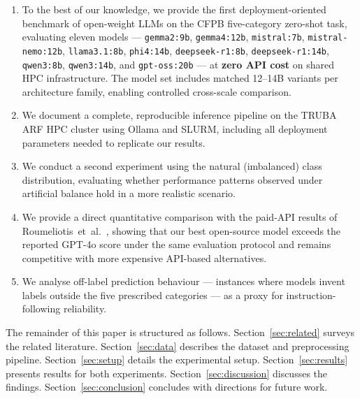 \documentclass[10pt,a4paper,twocolumn]{article}
\begin{document}
\begin{enumerate}
  \item To the best of our knowledge, we provide the first
        deployment-oriented benchmark of open-weight LLMs on the
        CFPB five-category zero-shot task, evaluating eleven models ---
        \texttt{gemma2:9b}, \texttt{gemma4:12b}, \texttt{mistral:7b},
        \texttt{mistral-nemo:12b}, \texttt{llama3.1:8b}, \texttt{phi4:14b},
        \texttt{deepseek-r1:8b}, \texttt{deepseek-r1:14b},
        \texttt{qwen3:8b}, \texttt{qwen3:14b}, and \texttt{gpt-oss:20b}
        --- at \textbf{zero API cost} on shared HPC infrastructure.
        The model set includes matched 12--14B variants per architecture
        family, enabling controlled cross-scale comparison.

  \item We document a complete, reproducible inference pipeline on the
        TRUBA ARF HPC cluster using Ollama and SLURM, including
        all deployment parameters needed to replicate our results.

  \item We conduct a second experiment using the natural (imbalanced)
        class distribution, evaluating whether performance patterns
        observed under artificial balance hold in a more realistic
        scenario.

  \item We provide a direct quantitative comparison with the paid-API
        results of Roumeliotis~et~al.\ \cite{roumeliotis2025think},
        showing that our best open-source model exceeds the reported
        GPT-4o score under the same evaluation protocol and remains
        competitive with more expensive API-based alternatives.

  \item We analyse off-label prediction behaviour --- instances where
        models invent labels outside the five prescribed categories ---
        as a proxy for instruction-following reliability.
\end{enumerate}

The remainder of this paper is structured as follows.
Section~\ref{sec:related} surveys the related literature.
Section~\ref{sec:data} describes the dataset and preprocessing
pipeline. Section~\ref{sec:setup} details the experimental setup.
Section~\ref{sec:results} presents results for both experiments.
Section~\ref{sec:discussion} discusses the findings.
Section~\ref{sec:conclusion} concludes with directions for future work.
\end{document}
